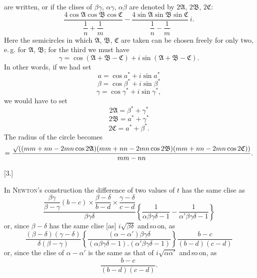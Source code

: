 %
are written, or if the clises of $\beta\gamma$, $\alpha\gamma$, $\alpha\beta$ are denoted by $2\mathfrak{A}$, $2\mathfrak{B}$, $2\mathfrak{C}$:
\[
\frac{4\cos\mathfrak{A}\cos\mathfrak{B}\cos\mathfrak{C}}{\dfrac{1}{n}+\dfrac{1}{m}} - \frac{4\sin\mathfrak{A}\sin\mathfrak{B}\sin\mathfrak{C}}{\dfrac{1}{n}-\dfrac{1}{m}}\, i.
\]
Here the semicircles in which $\mathfrak{A}$, $\mathfrak{B}$, $\mathfrak{C}$ are taken can be chosen freely for only two, e.\,g. for $\mathfrak{A}$, $\mathfrak{B}$; for the third we must have
\[
\gamma = \cos(\mathfrak{A}+\mathfrak{B}-\mathfrak{C}) + i\sin(\mathfrak{A}+\mathfrak{B}-\mathfrak{C}).
\]
In other words, if we had set
\[
a = \cos a^{*} + i\sin a^{*}
\]
\[
\beta = \cos \beta^{*} + i\sin \beta^{*}
\]
\[
\gamma = \cos \gamma^{*} + i\sin \gamma^{*},
\]
we would have to set
\[
2\mathfrak{A} = \beta^{*}+\gamma^{*}
\]
\[
2\mathfrak{B} = a^{*}+\gamma^{*}
\]
\[
2\mathfrak{C} = a^{*}+\beta^{*}.
\]
The radius of the circle becomes
\begingroup\small
\[
= \frac{\mathord{\surd}((mm+nn-2mn\cos 2\mathfrak{A})(mm+nn-2mn\cos 2\mathfrak{B})(mm+nn-2mn\cos 2\mathfrak{C}))}{mm-nn}.
\]
\endgroup

\begin{center}[3.]\end{center}

In \textsc{Newton}'s construction the difference of two values of $t$ has the same clise as
\[
\frac{\dfrac{\beta\gamma}{\beta-\gamma}(b-c)\times\dfrac{\beta-\delta}{b-d}\times\dfrac{\gamma-\delta}{c-d}}{\beta\gamma\delta}
\left\{\frac{1}{\alpha\beta\gamma\delta-1}-\frac{1}{\alpha'\beta\gamma\delta-1}\right\}
\]
or, since $\beta-\delta$ has the same clise [as] $i\sqrt{\beta\delta}$ and\,so\,on, as
\[
\frac{(\beta-\delta)(\gamma-\delta)}{\delta(\beta-\gamma)}
\left\{\frac{(\alpha-\alpha')\beta\gamma\delta}{(\alpha\beta\gamma\delta-1).(\alpha'\beta\gamma\delta-1)}\right\}
\frac{b-c}{(b-d)(c-d)}
\]
or, since the clise of $\alpha-\alpha'$ is the same as that of $i\sqrt{\alpha\alpha'}$ and\,so\,on, as
\[
\frac{b-c}{(b-d)(c-d)}.
\]
